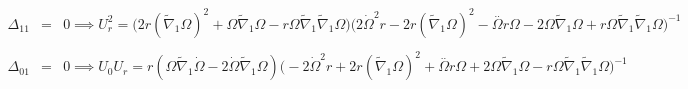 \documentclass[10pt,letterpaper]{article}
\numberwithin{equation}{section}
\begin{document}
\begin{eqnarray}
\nonumber\\
\\
\Delta_{11} &=& 0 \implies \boxed{U_r^2 =\bigl(2 r (\tilde{\nabla}_{1}\Omega)^2 + \Omega \tilde{\nabla}_{1}\Omega -  r \Omega \tilde{\nabla}_{1}\tilde{\nabla}_{1}\Omega \bigr) \bigl(2 \dot{\Omega}^2 r - 2 r (\tilde{\nabla}_{1}\Omega)^2 -  \overset{..}{\Omega} r \Omega - 2 \Omega \tilde{\nabla}_{1}\Omega + r \Omega \tilde{\nabla}_{1}\tilde{\nabla}_{1}\Omega \bigr)^{-1}}
\nonumber\\
\\
\Delta_{01} &=& 0 \implies \boxed{U_0 U_r =r (\Omega \tilde{\nabla}_{1}\dot{\Omega} - 2 \dot{\Omega} \tilde{\nabla}_{1}\Omega) \bigl(-2 \dot{\Omega}^2 r + 2 r (\tilde{\nabla}_{1}\Omega)^2 + \overset{..}{\Omega} r \Omega + 2 \Omega \tilde{\nabla}_{1}\Omega -  r \Omega \tilde{\nabla}_{1}\tilde{\nabla}_{1}\Omega \bigr)^{-1}}
\phantom{}
\end{eqnarray}
%
%
\end{document}
